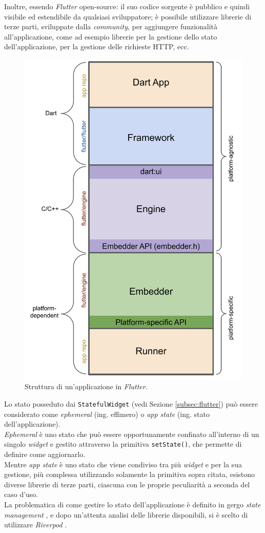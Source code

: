 Inoltre, essendo \emph{Flutter} \gls{open-source}\glsoccur: il suo codice sorgente è pubblico e quindi visibile ed estendibile da qualsiasi sviluppatore; è possibile utilizzare librerie di terze parti, sviluppate dalla \emph{community}, per aggiungere funzionalità all'applicazione, come ad esempio librerie per la gestione dello stato dell'applicazione, per la gestione delle richieste HTTP, ecc. \\

\begin{figure}[!h] 
    \centering 
    \includegraphics[width=0.4\columnwidth]{images/flutter-app-anatomy.png} 
    \caption{Struttura di un'applicazione \cite{site:flutter-architecture} in \emph{Flutter}.}
    \label{fig:architettura-flutter}
\end{figure}

Lo stato posseduto dai \lstinline{StatefulWidget} (vedi Sezione \ref{subsec:flutter}) può essere considerato come \emph{ephemeral} (ing. effimero) o \emph{app state} (ing. stato dell'applicazione). \\
\emph{Ephemeral} è uno stato che può essere opportunamente confinato all'interno di un singolo \emph{widget} e gestito attraverso la primitiva \lstinline{setState()}, che permette di definire come aggiornarlo.\\
Mentre \emph{app state} è uno stato che viene condiviso tra più \emph{widget} e per la sua gestione, più complessa utilizzando solamente la primitiva sopra citata, esistono diverse librerie di terze parti, ciascuna con le proprie peculiarità a seconda del caso d'uso.\\
La problematica di come gestire lo stato dell'applicazione è definito in gergo \emph{state management} \cite{site:flutter-state-mgmt}, e dopo un'attenta analisi delle librerie disponibili, si è scelto di utilizzare \emph{Riverpod} \cite{site:riverpod}.
